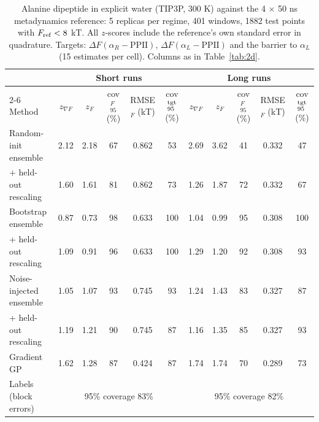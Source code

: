 \begin{table}
\caption{Alanine dipeptide in explicit water (TIP3P, 300 K) against the 4 $\times$ 50 ns metadynamics reference: 5 replicas per regime, 401 windows, 1882 test points with $F_{\rm ref}<8$ kT. All $z$-scores include the reference's own standard error in quadrature. Targets: $\Delta F(\alpha_R-\mathrm{PPII})$, $\Delta F(\alpha_L-\mathrm{PPII})$ and the barrier to $\alpha_L$ (15 estimates per cell). Columns as in Table~\ref{tab:2d}.}
\label{tab:ala2water}
\begin{ruledtabular}
\begin{tabular}{lcccccccccc}
 & \multicolumn{5}{c}{Short runs} & \multicolumn{5}{c}{Long runs} \\
\cline{2-6}\cline{7-11}
Method & $z_{\nabla F}$ & $z_F$ & cov$_{95}^F$ (\%) & RMSE$_F$ (kT) & cov$_{95}^{\rm tgt}$ (\%) & $z_{\nabla F}$ & $z_F$ & cov$_{95}^F$ (\%) & RMSE$_F$ (kT) & cov$_{95}^{\rm tgt}$ (\%) \\
\hline
Random-init ensemble & 2.12 & 2.18 & 67 & 0.862 & 53 & 2.69 & 3.62 & 41 & 0.332 & 47 \\
\quad + held-out rescaling & 1.60 & 1.61 & 81 & 0.862 & 73 & 1.26 & 1.87 & 72 & 0.332 & 67 \\
Bootstrap ensemble & 0.87 & 0.73 & 98 & 0.633 & 100 & 1.04 & 0.99 & 95 & 0.308 & 100 \\
\quad + held-out rescaling & 1.09 & 0.91 & 96 & 0.633 & 100 & 1.29 & 1.20 & 92 & 0.308 & 93 \\
Noise-injected ensemble & 1.05 & 1.07 & 93 & 0.745 & 93 & 1.24 & 1.43 & 83 & 0.327 & 87 \\
\quad + held-out rescaling & 1.19 & 1.21 & 90 & 0.745 & 87 & 1.16 & 1.35 & 85 & 0.327 & 93 \\
Gradient GP & 1.62 & 1.28 & 87 & 0.424 & 87 & 1.74 & 1.74 & 70 & 0.289 & 73 \\
\hline
Labels (block errors) & \multicolumn{5}{c}{95\% coverage 83\%} & \multicolumn{5}{c}{95\% coverage 82\%} \\
\end{tabular}
\end{ruledtabular}
\end{table}
